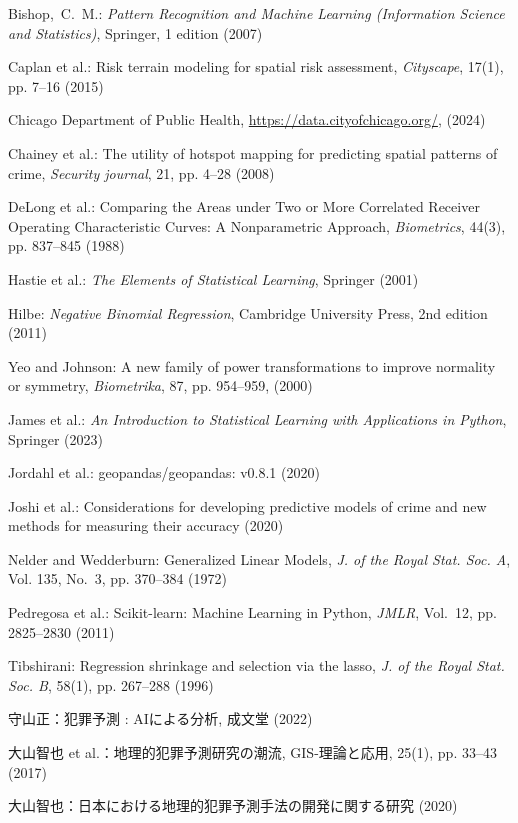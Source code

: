 \begin{thebibliography}{}

  Bishop,~C.~M.: {\em Pattern Recognition and Machine Learning (Information Science and Statistics)}, Springer, 1 edition (2007)
  
  Caplan et al.: Risk terrain modeling for spatial risk assessment, {\em Cityscape}, 17(1), pp. 7--16 (2015)
  
  Chicago Department of Public Health, \url{https://data.cityofchicago.org/}, (2024)
  
  Chainey et al.: The utility of hotspot mapping for predicting spatial patterns of crime, {\em Security journal}, 21, pp. 4--28 (2008)
  
  DeLong et al.: Comparing the Areas under Two or More Correlated Receiver Operating Characteristic Curves: A Nonparametric Approach, {\em Biometrics}, 44(3), pp. 837--845 (1988)
  
  Hastie et al.: {\em The Elements of Statistical Learning}, %
  Springer (2001)
  
  Hilbe: {\em Negative Binomial Regression}, Cambridge University Press, 2nd edition (2011)

  Yeo and Johnson: A new family of power transformations to improve normality or symmetry, {\em Biometrika}, 87, pp. 954--959, (2000)

  James et al.: {\em An Introduction to Statistical Learning with Applications in Python}, Springer (2023)
  
  Jordahl et al.: geopandas/geopandas: v0.8.1 (2020)
  
  Joshi et al.: Considerations for developing predictive models of crime and new methods for measuring their accuracy (2020)
  
  Nelder and Wedderburn: Generalized Linear Models, {\em J. of the Royal Stat. Soc. A}, Vol. 135, No.~3, pp. 370--384 (1972)
  
  Pedregosa et al.: Scikit-learn: Machine Learning in {P}ython, {\em JMLR}, Vol.~12, pp. 2825--2830 (2011)
  
  Tibshirani: Regression shrinkage and selection via the lasso, {\em J. of the Royal Stat. Soc. B}, 58(1),  pp. 267--288 (1996)
  
  守山正：犯罪予測 : AIによる分析, 成文堂 (2022)
  
  大山智也 et al.：地理的犯罪予測研究の潮流, GIS-理論と応用, 25(1), pp. 33--43 (2017)
  
  大山智也：日本における地理的犯罪予測手法の開発に関する研究 (2020)
  
  \end{thebibliography}
  